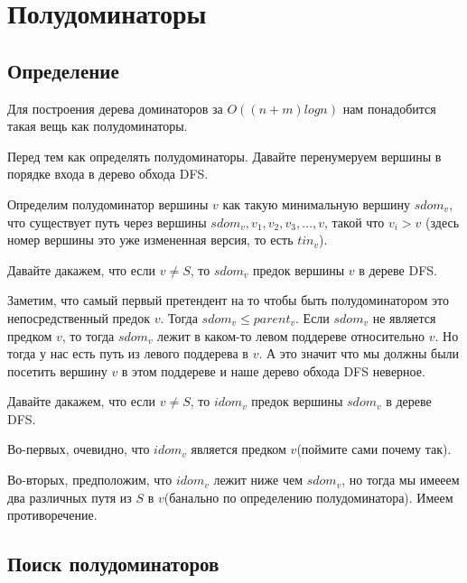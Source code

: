 \documentclass[a4paper, fontsize=12pt]{article}
\begin{document}
\newpage

\section{Полудоминаторы}

\subsection{Определение}

Для построения дерева доминаторов за $O((n + m) log n)$ нам понадобится такая вещь как полудоминаторы. 

Перед тем как определять полудоминаторы. Давайте перенумеруем вершины в порядке входа в дерево обхода DFS. 

Определим полудоминатор вершины $v$ как такую минимальную вершину $sdom_v$, что существует путь через вершины $sdom_v, v_1, v_2, v_3, \ldots, v$, такой что $v_i > v$ (здесь номер вершины это уже измененная версия, то есть $tin_v$).

\begin{theorem} \label{t2}
Давайте дакажем, что если $v \neq S$, то $sdom_v$ предок вершины $v$ в дереве DFS. 

Заметим, что самый первый претендент на то чтобы быть полудоминатором это непосредственный предок $v$. Тогда $sdom_v \leq parent_v$. Если $sdom_v$ не является предком $v$, то тогда $sdom_v$ лежит в каком-то левом поддереве относительно $v$. Но тогда у нас есть путь из левого поддерева в $v$. А это значит что мы должны были посетить вершину $v$ в этом поддереве и наше дерево обхода DFS неверное.

\end{theorem}

\begin{theorem} \label{t3}
Давайте дакажем, что если $v \neq S$, то $idom_v$ предок вершины $sdom_v$ в дереве DFS.

Во-первых, очевидно, что $idom_v$ является предком $v$(поймите сами почему так).

Во-вторых, предположим, что $idom_v$ лежит ниже чем $sdom_v$, но тогда мы имееем два различных путя из $S$ в $v$(банально по определению полудоминатора). Имеем противоречение. 

\end{theorem}

\subsection{Поиск полудоминаторов}
\end{document}

